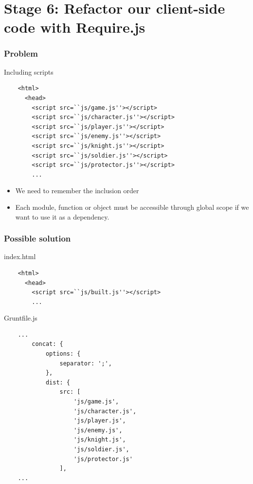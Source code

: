\section{Stage 6: Refactor our client-side code with Require.js}

\begin{frame}[fragile]
  \begin{center}
  \end{center}
\end{frame}

\begin{frame}[fragile]
  \frametitle{Problem}

  \begin{block}{Including scripts}
    {\scriptsize
    \begin{verbatim}
    <html>
      <head>
        <script src=``js/game.js''></script>
        <script src=``js/character.js''></script>
        <script src=``js/player.js''></script>
        <script src=``js/enemy.js''></script>
        <script src=``js/knight.js''></script>
        <script src=``js/soldier.js''></script>
        <script src=``js/protector.js''></script>
        ...
    \end{verbatim}
    }
  \end{block}

  \pause
  
  \begin{itemize}
    \item We need to remember the inclusion order 
    \item Each module, function or object must be accessible through global scope if we want to use it as a dependency.
  \end{itemize}
\end{frame}

\begin{frame}[fragile]
  \frametitle{Possible solution}

  \begin{block}{index.html}
    {\tiny
    \begin{verbatim}
    <html>
      <head>
        <script src=``js/built.js''></script>
        ...
    \end{verbatim}
    }
  \end{block}

  \begin{block}{Gruntfile.js}
    {\tiny
    \begin{verbatim}
    ...
        concat: {
            options: {
                separator: ';',
            },
            dist: {
                src: [
                    'js/game.js',
                    'js/character.js',
                    'js/player.js',
                    'js/enemy.js',
                    'js/knight.js',
                    'js/soldier.js',
                    'js/protector.js'
                ],
    ...
    \end{verbatim}
    }
  \end{block}
\end{frame}

